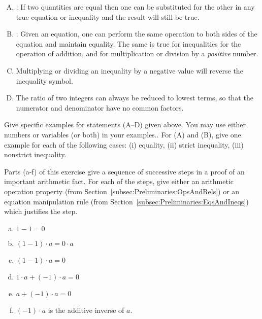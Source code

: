 \begin{enumerate}[(A)]
\item
{}: If two quantities are equal then one can be substituted for the other in any true equation or inequality and the result will still be true. 
\item
{}: Given an equation, one can perform the same operation to both sides of the equation and maintain equality.  The same is true for inequalities for the operation of addition, and for multiplication or division by a \emph{positive} number.
\item
{}
Multiplying or dividing an inequality by a negative value will reverse the inequality symbol.
\item
{}
The ratio of two integers can always be reduced to lowest terms, so that the numerator and denominator have no common factors.
\end {enumerate}

\begin{exercise}{4}
Give specific examples for statements (A--D)   given above. You may use either numbers or variables (or both) in your examples.. For (A) and (B), give one example for each of the following cases: (i) equality, (ii) strict inequality, (iii) nonstrict inequality.
\end{exercise}

\begin{exercise}{}
Parts (a-f) of this exercise give a sequence of successive steps in a proof of an important arithmetic fact. For each of the steps, give either an arithmetic operation property (from Section~\ref{subsec:Preliminaries:OpsAndRels}) or an equation manipulation rule (from Section~\ref{subsec:Preliminaries:EqsAndIneqs}) which justifies the step.
\begin{enumerate}[(a)]
\item
$1 -1 = 0$
\item
$(1-1)\cdot a = 0 \cdot a$
\item
$(1-1)\cdot a = 0$
\item
$1 \cdot a + (-1) \cdot a = 0$
\item
$a + (-1) \cdot a = 0$
\item
$(-1) \cdot a$ is the additive inverse of $a$.
\end{enumerate}
\end{exercise}

